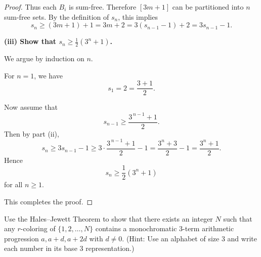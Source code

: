 \documentclass[11pt, a4paper]{ctexrep}
\begin{document}
\begin{proof}
    Thus each $B_i$ is sum-free. Therefore $[3m+1]$ can be partitioned into $n$ sum-free sets. By the definition of $s_n$, this implies
    \[
        s_n\ge (3m+1)+1=3m+2=3(s_{n-1}-1)+2=3s_{n-1}-1.
    \]

    \medskip

    \noindent\textbf{(iii) Show that $s_n\ge \frac12(3^n+1)$.}

    \smallskip

    We argue by induction on $n$.

    For $n=1$, we have
    \[
        s_1=2=\frac{3+1}{2}.
    \]

    Now assume that
    \[
        s_{n-1}\ge \frac{3^{\,n-1}+1}{2}.
    \]
    Then by part (ii),
    \[
        s_n\ge 3s_{n-1}-1
        \ge 3\cdot \frac{3^{\,n-1}+1}{2}-1
        = \frac{3^n+3}{2}-1
        = \frac{3^n+1}{2}.
    \]
    Hence
    \[
        s_n\ge \frac12(3^n+1)
    \]
    for all $n\ge 1$.

    This completes the proof.
\end{proof}

\begin{exercise}
    Use the Hales--Jewett Theorem to show that there exists an integer $N$ such that any $r$-coloring of $\{1, 2, \ldots, N\}$ contains a monochromatic $3$-term arithmetic progression $a, a+d, a+2d$ with $d \neq 0$. (Hint: Use an alphabet of size $3$ and write each number in its base $3$ representation.)
\end{exercise}
\end{document}
